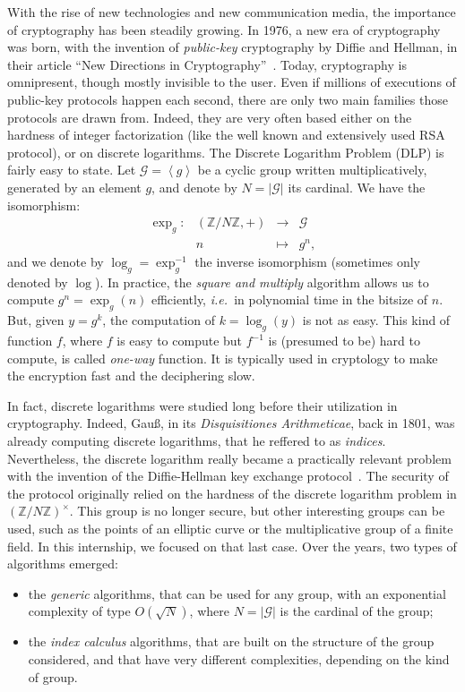 \documentclass[a4paper,11pt]{article}
\theoremstyle{break}
\theoremstyle{sc}
\theoremstyle{definition}
\theoremstyle{remark}
\newcommand{\ie}{\emph{i.e.\ }}
\begin{document}
With the rise of new technologies and new communication media, the importance of
cryptography has been steadily growing. In 1976, a new era of cryptography was
born, with the invention of \emph{public-key} cryptography by Diffie and
Hellman, in their article ``New Directions in Cryptography''~\cite{DH76}. Today,
cryptography is omnipresent, though mostly invisible to the user. Even if
millions of executions of public-key protocols happen each second, there are only two
main families those protocols are drawn from. Indeed, they are
very often based either on the hardness of integer factorization (like the well known
and extensively used RSA protocol), or on discrete logarithms. The Discrete
Logarithm Problem (DLP) is fairly easy to state. Let $\mathcal G=\left\langle
g\right\rangle$ be a cyclic group written multiplicatively, generated by an element
$g$, and denote by $N=|\mathcal G|$ its cardinal. We have the isomorphism:
\[
 \begin{array}{cccc}
   \exp_g: & (\mathbb{Z}/N\mathbb{Z},+) & \to & \mathcal G \\
   & n & \mapsto & g^n,
 \end{array}
\]
and we denote by $\log_g=\exp_g^{-1}$ the inverse isomorphism (sometimes only
denoted by $\log$). In practice, the
\emph{square and multiply} algorithm allows us to compute $g^n=\exp_g(n)$
efficiently, \ie in polynomial time in the bitsize of $n$. But, given $y = g^k$, the computation of $k
= \log_g(y)$ is not as easy. This kind of function $f$, where $f$ is easy to
compute but $f^{-1}$ is (presumed to be) hard to compute, is called \emph{one-way} function.
It is
typically used in cryptology to make the encryption fast and the deciphering
slow. 

In fact, discrete
logarithms were studied long before their utilization in cryptography. Indeed,
Gauß, in its \emph{Disquisitiones Arithmeticae}, back in 1801, was already
computing discrete logarithms, that he reffered to as \emph{indices}.
Nevertheless, the discrete logarithm really became a practically relevant problem
with the invention of the Diffie-Hellman key exchange protocol~\cite{DH76}. The
security of the protocol originally relied on the hardness of the discrete
logarithm problem in $(\mathbb{Z}/N\mathbb{Z})^\times$. This group is no longer
secure, but other interesting groups can be used, such as the points of an
elliptic curve or the multiplicative group of a finite field. In this
internship, we focused on that last case. Over the years, two
types of algorithms emerged:
\begin{itemize}
  \item the \emph{generic} algorithms, that can be used for any group, with an
    exponential complexity of type $O(\sqrt N)$, where $N=|\mathcal G|$ is the cardinal
    of the group;
  \item the \emph{index calculus} algorithms, that are built on the structure of
    the group considered, and that have very different complexities, depending
    on the kind of group.
\end{itemize}
\end{document}
